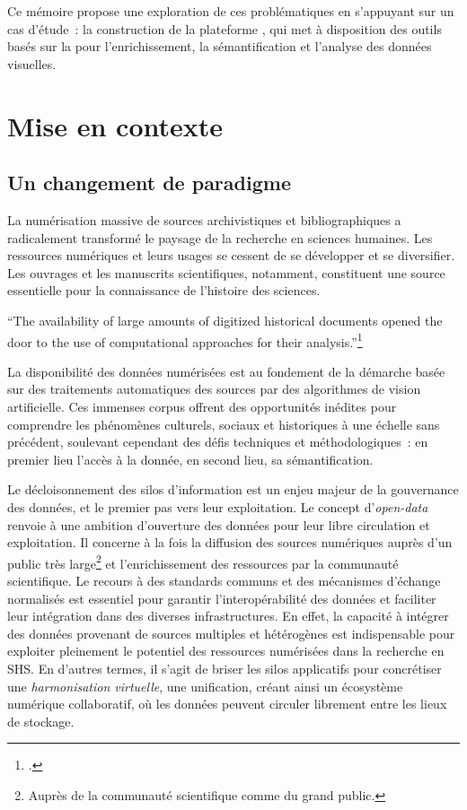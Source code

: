 Ce mémoire propose une exploration de ces problématiques en s'appuyant sur un cas d'étude~: la construction de la plateforme \aikon, qui met à disposition des outils basés sur la \cv pour l'enrichissement, la sémantification et l'analyse des données visuelles. 

\section{Mise en contexte}

\subsection{Un changement de paradigme}

La numérisation massive de sources archivistiques et bibliographiques a radicalement transformé le paysage de la recherche en sciences humaines. Les ressources numériques et leurs usages se cessent de se développer et se diversifier. Les ouvrages et les manuscrits scientifiques, notamment, constituent une source essentielle pour la connaissance de l’histoire des sciences.

\begin{kwote}
``The availability of large amounts of digitized historical documents opened the door to the use of computational approaches for their analysis.''\footcite[p.2]{buttner_cordeep_2022}
\end{kwote}

La disponibilité des données numérisées est au fondement de la démarche basée sur des traitements automatiques des sources par des algorithmes de vision artificielle. Ces immenses corpus offrent des opportunités inédites pour comprendre les phénomènes culturels, sociaux et historiques à une échelle sans précédent, soulevant cependant des défis techniques et méthodologiques~: en premier lieu l'accès à la donnée, en second lieu, sa sémantification.  

Le décloisonnement des silos d'information est un enjeu majeur de la gouvernance des données, et le premier pas vers leur exploitation. Le concept d'\textit{open-data} renvoie à une ambition d'ouverture des données pour leur libre circulation et exploitation. Il concerne à la fois la diffusion des sources numériques auprès d'un public très large\footnote{Auprès de la communauté scientifique comme du grand public.} et l'enrichissement des ressources par la communauté scientifique. Le recours à des standards communs et des mécanismes d'échange normalisés est essentiel pour garantir l'interopérabilité des données et faciliter leur intégration dans des diverses infrastructures. En effet, la capacité à intégrer des données provenant de sources multiples et hétérogènes est indispensable pour exploiter pleinement le potentiel des ressources numérisées dans la recherche en \textsc{SHS}. En d'autres termes, il s'agit de briser les silos applicatifs pour concrétiser une \textit{harmonisation virtuelle}, une unification, créant ainsi un écosystème numérique collaboratif, où les données peuvent circuler librement entre les lieux de stockage. 

